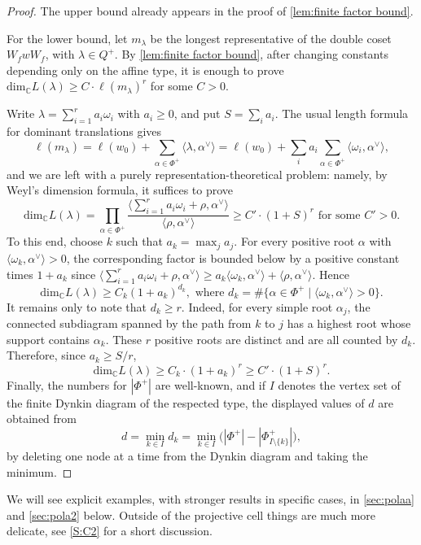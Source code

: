 \documentclass[a4paper,11pt]{amsart}
\newcommand{\C}{\mathbb{C}}
\renewcommand{\dim}[1][\C]{\mathrm{dim}_{#1}}
\numberwithin{equation}{subsection}
\theoremstyle{definition}
\theoremstyle{remark}
\begin{document}
\begin{proof}
The upper bound already appears in the proof of
\autoref{lem:finite factor bound}.

For the lower bound, let \(m_\lambda\) be the longest representative of the
double coset \(W_f w W_f\), with \(\lambda\in Q^+\). By
\autoref{lem:finite factor bound}, after changing constants depending only on
the affine type, it is enough to prove
$\dim L(\lambda)\geq C\cdot \ell(m_\lambda)^r$
for some \(C>0\).

Write
$\lambda=\sum_{i=1}^r a_i\omega_i$
with \(a_i\geq 0\), and put \(S=\sum_i a_i\). The usual length formula for
dominant translations gives
\[
\ell(m_\lambda)
=
\ell(w_0)+\sum_{\alpha\in\Phi^+}\langle \lambda,\alpha^\vee\rangle
=
\ell(w_0)+\sum_i a_i
\sum_{\alpha\in\Phi^+}\langle \omega_i,\alpha^\vee\rangle,
\]
and we are left with a purely representation-theoretical problem: namely, by Weyl's
dimension formula, it suffices to prove
\[
\dim L(\lambda)=
\prod_{\alpha\in\Phi^+}
\frac{\langle {\textstyle\sum_{i=1}^r} a_i\omega_i+\rho,\alpha^\vee\rangle}
{\langle \rho,\alpha^\vee\rangle}\geq C'\cdot (1+S)^r\text{ for some }C'>0.
\]
To this end, choose \(k\) such that \(a_k=\max_j a_j\).
For every positive root \(\alpha\) with
\(\langle \omega_k,\alpha^\vee\rangle>0\), the corresponding factor is bounded
below by a positive constant times \(1+a_k\) since
$\langle {\textstyle\sum_{i=1}^r} a_i\omega_i+\rho,\alpha^\vee\rangle
\geq
a_k\langle \omega_k,\alpha^\vee\rangle+\langle \rho,\alpha^\vee\rangle$.
Hence
\[
\dim L(\lambda)
\geq
C_k(1+a_k)^{d_k},
\text{ where }
d_k=\#\{\alpha\in\Phi^+\mid \langle \omega_k,\alpha^\vee\rangle>0\}.
\]
It remains only to note that \(d_k\geq r\). Indeed, for every simple root
\(\alpha_j\), the connected subdiagram spanned by the path from \(k\) to \(j\)
has a highest root whose support contains \(\alpha_k\). These \(r\) positive
roots are distinct and are all counted by \(d_k\).
Therefore, since \(a_k\geq S/r\),
\[
\dim L(\lambda)
\geq
C_k\cdot (1+a_k)^r
\geq
C'\cdot (1+S)^r.
\]
Finally, the numbers for $|\Phi^+|$ are well-known, and if $I$ denotes the vertex set of the finite Dynkin diagram of the respected type, the displayed values of \(d\) are obtained from
\[
d=\min_{k\in I}d_k=\min_{k\in I}\big(|\Phi^+|-|\Phi^+_{I\setminus\{k\}}|\big),
\]
by deleting one node at a time from the Dynkin diagram and taking the minimum.
\end{proof}

We will see explicit examples, with stronger results in specific cases, in
\autoref{sec:polaa} and \autoref{sec:pola2} below. Outside of the projective cell
things are much more delicate, see \autoref{S:C2} for a short discussion.
\end{document}

